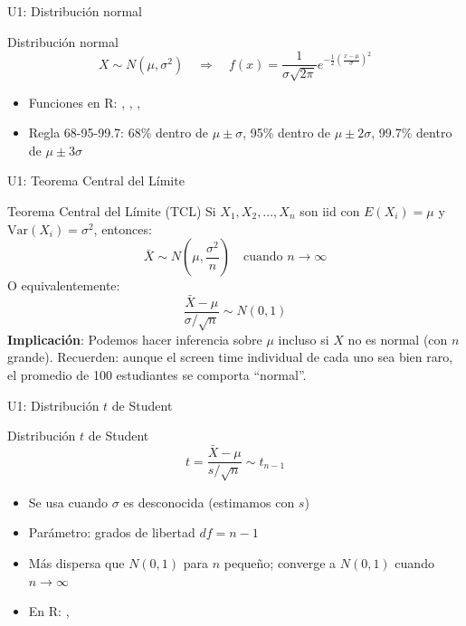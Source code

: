 \documentclass[aspectratio=169, 11pt]{beamer}
\begin{document}
\begin{frame}{U1: Distribución normal}
\begin{block}{Distribución normal}
$$X \sim N(\mu, \sigma^2) \quad \Rightarrow \quad f(x) = \frac{1}{\sigma\sqrt{2\pi}}e^{-\frac{1}{2}\left(\frac{x-\mu}{\sigma}\right)^2}$$
\begin{itemize}
\item Funciones en R: , , , 
\item Regla 68-95-99.7: 68\% dentro de $\mu \pm \sigma$, 95\% dentro de $\mu \pm 2\sigma$, 99.7\% dentro de $\mu \pm 3\sigma$
\end{itemize}
\end{block}
\end{frame}

\begin{frame}{U1: Teorema Central del Límite}
\begin{block}{Teorema Central del Límite (TCL)}
Si $X_1, X_2, \ldots, X_n$ son iid con $E(X_i) = \mu$ y $\text{Var}(X_i) = \sigma^2$, entonces:
$$\bar{X} \sim N\left(\mu, \frac{\sigma^2}{n}\right) \quad \text{cuando } n \to \infty$$
O equivalentemente:
$$\frac{\bar{X} - \mu}{\sigma/\sqrt{n}} \sim N(0, 1)$$
\textbf{Implicaci\'on}: Podemos hacer inferencia sobre $\mu$ incluso si $X$ no es normal (con $n$ grande). Recuerden: aunque el screen time individual de cada uno sea bien raro, el promedio de 100 estudiantes se comporta ``normal''.
\end{block}
\end{frame}

\begin{frame}{U1: Distribución $t$ de Student}
\begin{block}{Distribución $t$ de Student}
$$t = \frac{\bar{X} - \mu}{s/\sqrt{n}} \sim t_{n-1}$$
\begin{itemize}
\item Se usa cuando $\sigma$ es desconocida (estimamos con $s$)
\item Parámetro: grados de libertad $df = n - 1$
\item Más dispersa que $N(0,1)$ para $n$ pequeño; converge a $N(0,1)$ cuando $n \to \infty$
\item En R: , 
\end{itemize}
\end{block}
\end{frame}
\end{document}
